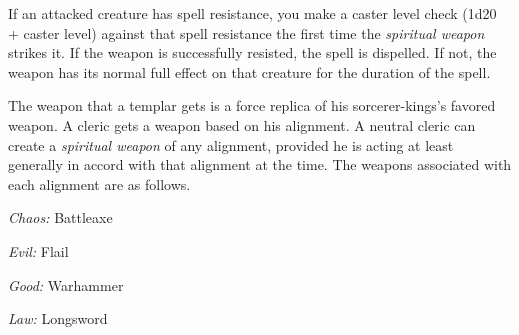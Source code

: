 {	If an attacked creature has spell resistance, you make a caster level check (1d20 + caster level) against that spell resistance the first time the \emph{spiritual weapon} strikes it. If the weapon is successfully resisted, the spell is dispelled. If not, the weapon has its normal full effect on that creature for the duration of the spell.

	The weapon that a templar gets is a force replica of his sorcerer-kings's favored weapon. A cleric gets a weapon based on his alignment. A neutral cleric can create a \emph{spiritual weapon} of any alignment, provided he is acting at least generally in accord with that alignment at the time. The weapons associated with each alignment are as follows.

	\textit{Chaos:}
	Battleaxe

	\textit{Evil:}
	Flail

	\textit{Good:}
	Warhammer

	\textit{Law:}
	Longsword

}
